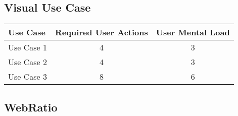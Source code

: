 \subsection*{Visual Use Case}




\begin{tabularx}{\textwidth}{Xcc}
\textbf{Use Case} & \textbf{Required User Actions} & \textbf{User Mental Load}\\
\hline
Use Case 1                          & 4 & 3 \\
Use Case 2                          & 4 & 3 \\
Use Case 3                          & 8 & 6
\end{tabularx}

\subsection*{WebRatio}



